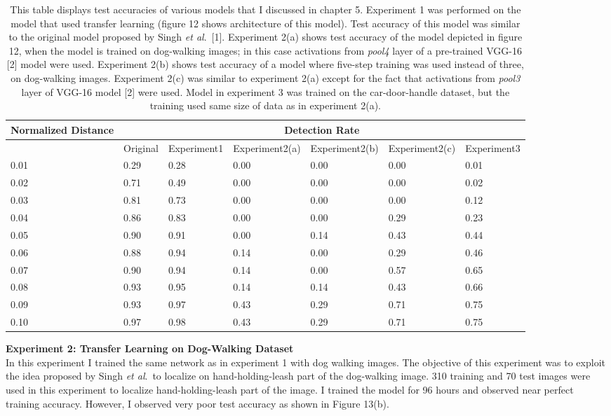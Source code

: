\documentclass [11pt,letterpaper ,twoside ,openany ]{report}
\begin{document}
    \begin{table}[t]
    \centering
    \small
    \begin{tabular}{ | p{1.8cm} | p{1.8cm} | p{1.8cm} | p{2.2cm} | p{2.2cm} | p{2.2cm} |  p{1.8cm}| }
    \hline
    Normalized Distance &  \multicolumn{6}{|c|}{Detection Rate} \\ \hline
    & Original & Experiment1 & Experiment2(a) & Experiment2(b) & Experiment2(c) & Experiment3 \\ \hline
    0.01 & 0.29 & 0.28 & 0.00 & 0.00 & 0.00 & 0.01 \\ \hline
    0.02 & 0.71 & 0.49 & 0.00 & 0.00 & 0.00 & 0.02 \\ \hline
    0.03 & 0.81 & 0.73 & 0.00 & 0.00 & 0.00 & 0.12 \\ \hline
    0.04 & 0.86 & 0.83 & 0.00 & 0.00 & 0.29 & 0.23 \\ \hline
    0.05 & 0.90 & 0.91 & 0.00 & 0.14 & 0.43 & 0.44 \\ \hline
    0.06 & 0.88 & 0.94 & 0.14 & 0.00 & 0.29 & 0.46 \\ \hline
    0.07 & 0.90 & 0.94 & 0.14 & 0.00 & 0.57 & 0.65 \\ \hline
    0.08 & 0.93 & 0.95 & 0.14 & 0.14 & 0.43 & 0.66 \\ \hline
    0.09 & 0.93 & 0.97 & 0.43 & 0.29 & 0.71 & 0.75 \\ \hline
    0.10 & 0.97 & 0.98 & 0.43 & 0.29 & 0.71 & 0.75 \\ \hline
    \end{tabular}
    \caption{This table displays test accuracies of various models that I discussed in chapter 5. Experiment 1 was performed on the model that used transfer learning (figure 12 shows architecture of this model). Test accuracy of this model was similar to the original model proposed by Singh \textit{et al}.\ [1]. Experiment 2(a) shows test accuracy of the model depicted in figure 12, when the model is trained on dog-walking images; in this case activations from \textit{pool4} layer of a pre-trained VGG-16 [2] model were used. Experiment 2(b) shows test accuracy of a model where five-step training was used instead of three, on dog-walking images. Experiment 2(c) was similar to experiment 2(a) except for the fact that activations from \textit{pool3} layer of VGG-16 model [2] were used. Model in experiment 3 was trained on the car-door-handle dataset, but the training used same size of data as in experiment 2(a).}
    \end{table}

    \noindent
    \textbf{Experiment 2: Transfer Learning on Dog-Walking Dataset}\\               
    In this experiment I trained the same network as in experiment 1 with dog walking images. The objective of this experiment was to exploit the idea proposed by Singh \textit{et al}.\ to localize on hand-holding-leash part of the dog-walking image. 310 training and 70 test images were used in this experiment to localize hand-holding-leash part of the image. I trained the model for 96 hours and observed near perfect training accuracy. However, I observed very poor test accuracy as shown in Figure 13(b).    
\end{document}
